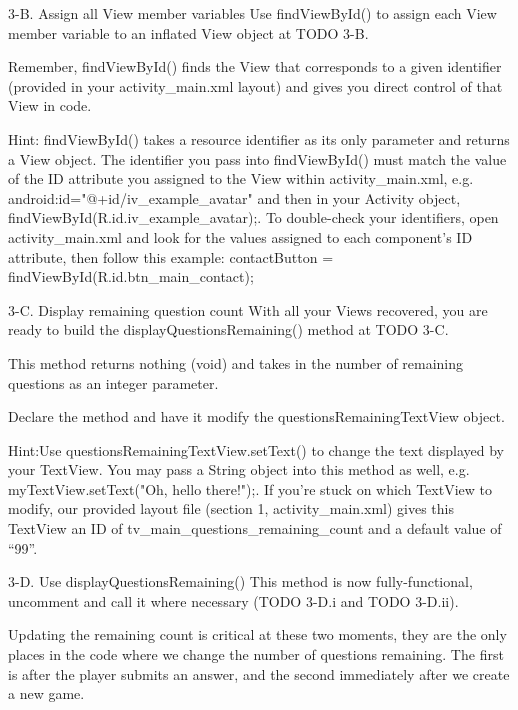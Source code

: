         3-B. Assign all View member variables
                Use findViewById() to assign each View member variable to an inflated View object at TODO 3-B.

                Remember, findViewById() finds the View that corresponds to a given identifier (provided in your activity_main.xml layout) and gives you direct control of that View in code.

                        Hint: findViewById() takes a resource identifier as its only parameter and returns a View object.
                        The identifier you pass into findViewById() must match the value of the ID attribute you assigned to the View within activity_main.xml, e.g. android:id="@+id/iv_example_avatar" and then in your Activity object, findViewById(R.id.iv_example_avatar);.
                        To double-check your identifiers, open activity_main.xml and look for the values assigned to each component’s ID attribute, then follow this example:
                                contactButton = findViewById(R.id.btn_main_contact);

        3-C. Display remaining question count
                With all your Views recovered, you are ready to build the displayQuestionsRemaining() method at TODO 3-C.

                This method returns nothing (void) and takes in the number of remaining questions as an integer parameter.

                Declare the method and have it modify the questionsRemainingTextView object.

                        Hint:Use questionsRemainingTextView.setText() to change the text displayed by your TextView.
                        You may pass a String object into this method as well, e.g. myTextView.setText("Oh, hello there!");.
                        If you’re stuck on which TextView to modify, our provided layout file (section 1, activity_main.xml) gives this TextView an ID of tv_main_questions_remaining_count and a default value of “99”.

        3-D. Use displayQuestionsRemaining()
                This method is now fully-functional, uncomment and call it where necessary (TODO 3-D.i and TODO 3-D.ii).

                Updating the remaining count is critical at these two moments, they are the only places in the code where we change the number of questions remaining. The first is after the player submits an answer, and the second immediately after we create a new game.


